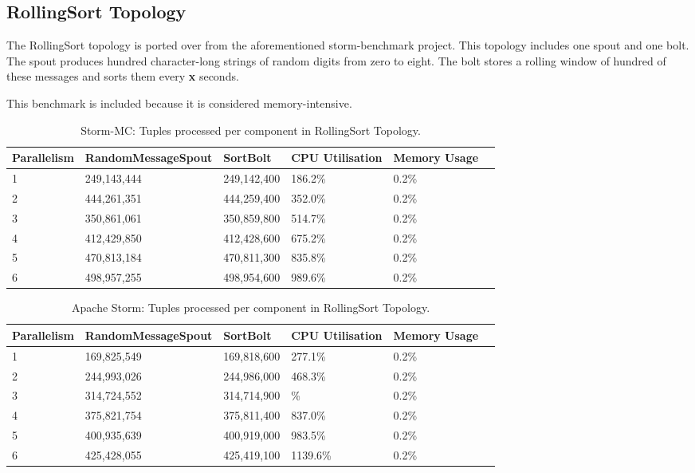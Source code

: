 \subsection{RollingSort Topology}

The RollingSort topology is ported over from the aforementioned storm-benchmark project. This topology includes one spout and one bolt. The spout produces hundred character-long strings of random digits from zero to eight. The bolt stores a rolling window of hundred of these messages and sorts them every \textbf{x} seconds.

This benchmark is included because it is considered memory-intensive.

\medskip
\begin{table}[!htb]
\begin{adjustwidth}{-0.5in}{-0.5in}
\centering
\small
\begin{tabular}{@{}llllll@{}}
    {Parallelism} & {RandomMessageSpout} & {SortBolt} & {CPU Utilisation} & {Memory Usage} \\ \toprule
    1 & {249,143,444} & {249,142,400} & {186.2\%} & {0.2\%} \\
    2 & {444,261,351} & {444,259,400} & {352.0\%} & {0.2\%} \\
    3 & {350,861,061} & {350,859,800} & {514.7\%} & {0.2\%} \\
    4 & {412,429,850} & {412,428,600} & {675.2\%} & {0.2\%} \\
    5 & {470,813,184} & {470,811,300} & {835.8\%} & {0.2\%} \\
    6 & {498,957,255} & {498,954,600} & {989.6\%} & {0.2\%} \\
\end{tabular}
\caption{Storm-MC: Tuples processed per component in RollingSort Topology.}
\end{adjustwidth}
\label{table:storm_mc_rolling}
\end{table}
\medskip	


\medskip
\begin{table}[!htb]
\begin{adjustwidth}{-0.5in}{-0.5in}
\centering
\small
\begin{tabular}{@{}llllll@{}}
    {Parallelism} & {RandomMessageSpout} & {SortBolt} & {CPU Utilisation} & {Memory Usage} \\ \toprule
    1 & {169,825,549} & {169,818,600} & {277.1\%} & {0.2\%} \\
    2 & {244,993,026} & {244,986,000} & {468.3\%} & {0.2\%} \\
    3 & {314,724,552} & {314,714,900} & {\%} & {0.2\%} \\
    4 & {375,821,754} & {375,811,400} & {837.0\%} & {0.2\%} \\
    5 & {400,935,639} & {400,919,000} & {983.5\%} & {0.2\%} \\
    6 & {425,428,055} & {425,419,100} & {1139.6\%} & {0.2\%} \\
\end{tabular}
\caption{Apache Storm: Tuples processed per component in RollingSort Topology.}
\end{adjustwidth}
\label{table:storm_rolling}
\end{table}
\medskip

